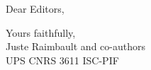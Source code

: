 \documentclass[11pt,a4paper,sans]{moderncv}        %
\begin{document}



\date{December 13, 2018}
\opening{Dear Editors,}
\closing{Yours faithfully,\\
Juste Raimbault and co-authors\\
UPS CNRS 3611 ISC-PIF
}
\makelettertitle






\end{document}
